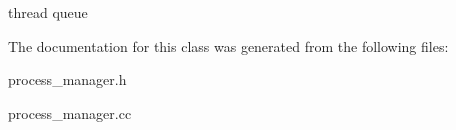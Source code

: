 \label{classprocess__manager__c_a0fa9dc97ed1a88aadc63b0a82ef24896}
thread queue 

The documentation for this class was generated from the following files:\begin{DoxyCompactItemize}
\item 
process\_\-manager.h\item 
process\_\-manager.cc\end{DoxyCompactItemize}
